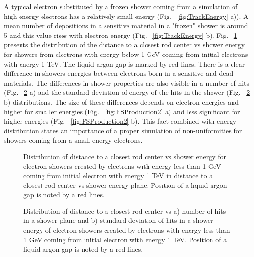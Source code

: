A typical electron substituted by a frozen shower coming from a simulation of high energy electrons has a relatively small energy (Fig. ~\ref{fig:TrackEnergy} a)). A mean number of depositions in a sensitive material in a "frozen" shower is around 5 and this value rises with electron energy (Fig. ~\ref{fig:TrackEnergy} b).  Fig. ~\ref{fig:FSProduction} presents the distribution of the distance to a closest rod center vs shower energy for showers from electrons with energy below 1 GeV coming from initial electrons with energy 1 TeV. The liquid argon gap is marked by red lines. There is a clear difference in showers energies between electrons born in a sensitive and dead materials. The differences in shower properties are also visible in a number of hits  (Fig. ~\ref{fig:ShowerProp} a) and the standard deviation of energy of the hits in the shower (Fig. ~\ref{fig:ShowerProp} b) distributions. The size of these differences depends on electron energies and higher for smaller energies (Fig. ~\ref{fig:FSProduction2} a) and less significant for higher energies (Fig. ~\ref{fig:FSProduction2} b).  This fact combined with energy distribution states an importance of a proper simulation of non-uniformities for showers coming from a small energy electrons.





\begin{figure}[!tbp]
\caption{Distribution of distance to a closest rod center vs shower energy for electron showers created by electrons with energy less than 1 GeV coming from initial electron with energy 1 TeV in distance to a closest rod center vs shower energy plane. Position of a liquid argon gap is noted by a red lines. }
\label{fig:FSProduction}
\end{figure}

\begin{figure}[!tbp]
\begin{minipage}[h]{0.49\linewidth}
\end{minipage}
\hfill
\begin{minipage}[h]{0.49\linewidth}
\end{minipage}
\caption{Distribution of distance to a closest rod center vs a) number of hits in a shower plane and b) standard deviation of hits in a shower energy of electron showers created by electrons with energy less than 1 GeV coming from initial electron with energy 1 TeV. Position of a liquid argon gap is noted by a red lines.}
\label{fig:ShowerProp}
\end{figure}

